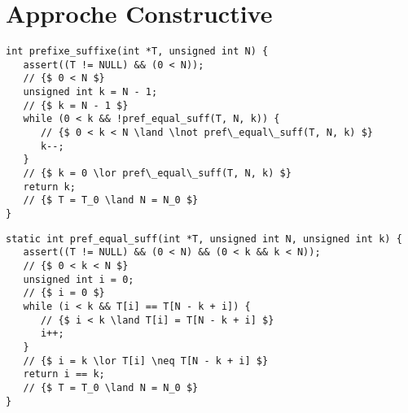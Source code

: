 \section{Approche Constructive}

\begin{lstlisting}[caption={SP1}]
int prefixe_suffixe(int *T, unsigned int N) {
   assert((T != NULL) && (0 < N));
   // {$ 0 < N $}
   unsigned int k = N - 1;
   // {$ k = N - 1 $}
   while (0 < k && !pref_equal_suff(T, N, k)) {
      // {$ 0 < k < N \land \lnot pref\_equal\_suff(T, N, k) $}
      k--;
   }
   // {$ k = 0 \lor pref\_equal\_suff(T, N, k) $}
   return k;
   // {$ T = T_0 \land N = N_0 $}
}
\end{lstlisting}


\begin{lstlisting}[caption={SP2}]
static int pref_equal_suff(int *T, unsigned int N, unsigned int k) {
   assert((T != NULL) && (0 < N) && (0 < k && k < N));
   // {$ 0 < k < N $}
   unsigned int i = 0;
   // {$ i = 0 $}
   while (i < k && T[i] == T[N - k + i]) {
      // {$ i < k \land T[i] = T[N - k + i] $}
      i++;
   }
   // {$ i = k \lor T[i] \neq T[N - k + i] $}
   return i == k;
   // {$ T = T_0 \land N = N_0 $}
}
\end{lstlisting}
